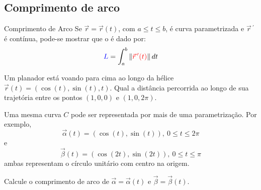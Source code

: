 %
%
%

\subsection*{Comprimento de arco}


\begin{frame}[label=fun-vet]{Comprimento de Arco}
	 Se {\color{red}$\vec{r}=\vec{r}(t)$}, com $a\leq t\leq b$, é curva parametrizada e {\color{red}$\vec{r}\,^\prime$ } é contínua, pode-se mostrar que o  é dado por:
	\[{\color{blue}L}=\int_a^b\|{\color{red}\vec{r}\,'(t)}\|\,dt\]
	\begin{exe}
		Um planador está voando para cima ao longo da hélice $\vec{r}(t)=(\cos(t),\sin(t),t)$. Qual a distância percorrida ao longo de sua trajetória entre os pontos $(1,0,0)$ e $(1,0,2\pi)$.
	\end{exe}
 \end{frame}


\begin{frame}
Uma mesma curva $C$ pode ser representada por mais de uma parametrização. Por exemplo, 
\[\vec{\alpha}(t)=(\cos(t),\sin(t)),\ 0\leq t\leq 2\pi\]
e
\[\vec{\beta}(t)=(\cos(2t),\sin(2t)),\ 0\leq t\leq \pi\]
ambas representam o círculo unitário com centro na origem. 

\begin{exer}
Calcule o comprimento de arco de $\vec{\alpha}=\vec{\alpha}(t)$ e $\vec{\beta}=\vec{\beta}(t)$.
\end{exer}
\end{frame}



